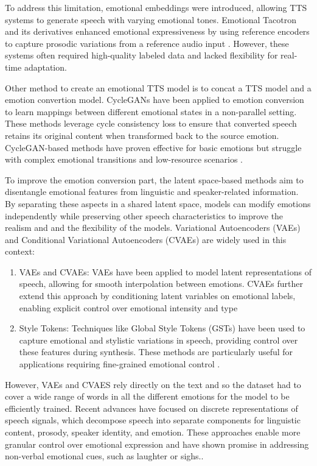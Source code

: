 To address this limitation, emotional embeddings were introduced, allowing TTS systems to generate speech with varying emotional tones. Emotional Tacotron and its derivatives enhanced emotional expressiveness by using reference encoders to capture prosodic variations from a reference audio input \cite{skerry2018towards}. However, these systems often required high-quality labeled data and lacked flexibility for real-time adaptation.

Other method to create an emotional TTS model is to concat a TTS model and a emotion convertion model. CycleGANs have been applied to emotion conversion to learn mappings between different emotional states in a non-parallel setting. These methods leverage cycle consistency loss to ensure that converted speech retains its original content when transformed back to the source emotion. CycleGAN-based methods have proven effective for basic emotions but struggle with complex emotional transitions and low-resource scenarios \cite{kaneko2019cyclegan}.

To improve the emotion conversion part, the latent space-based methods aim to disentangle emotional features from linguistic and speaker-related information. By separating these aspects in a shared latent space, models can modify emotions independently while preserving other speech characteristics to improve the realism and and the flexibility of the models. Variational Autoencoders (VAEs) and Conditional Variational Autoencoders (CVAEs) are widely used in this context:
\begin{enumerate}
\item VAEs and CVAEs: VAEs have been applied to model latent representations of speech, allowing for smooth interpolation between emotions. CVAEs further extend this approach by conditioning latent variables on emotional labels, enabling explicit control over emotional intensity and type \cite{hsu2018hierarchical}
\item Style Tokens: Techniques like Global Style Tokens (GSTs) have been used to capture emotional and stylistic variations in speech, providing control over these features during synthesis. These methods are particularly useful for applications requiring fine-grained emotional control \cite{kwon2019effective}.
\end{enumerate}

However, VAEs and CVAES rely directly on the text and so the dataset had to cover a wide range of words in all the different emotions for the model to be efficiently trained. Recent advances have focused on discrete representations of speech signals, which decompose speech into separate components for linguistic content, prosody, speaker identity, and emotion. These approaches enable more granular control over emotional expression and have shown promise in addressing non-verbal emotional cues, such as laughter or sighs.\cite{kwon2019effective}.


